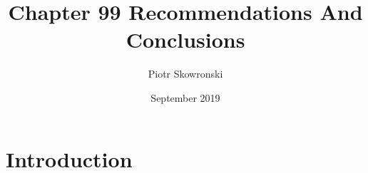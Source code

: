 \documentclass{article}
\title{Chapter 99 Recommendations And Conclusions}
\author{Piotr Skowronski}
\date{September 2019}
\begin{document}
\maketitle

\section{Introduction}
\end{document}
